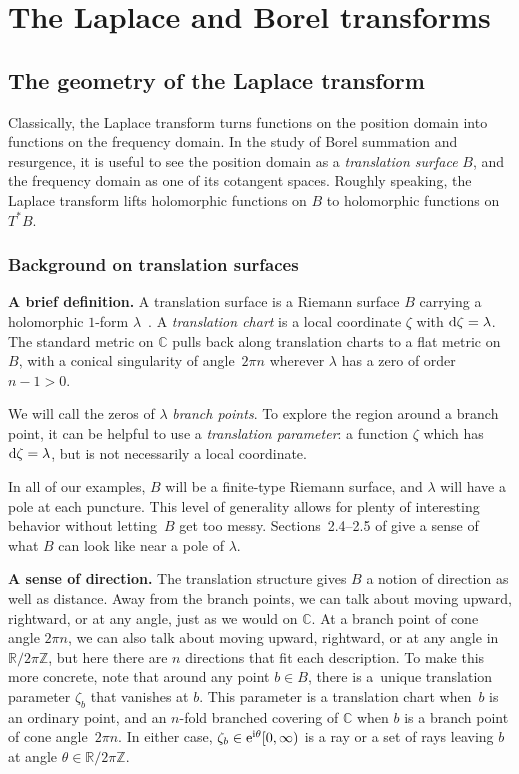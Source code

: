 \documentclass[10pt,a4paper]{amsart}
\newcommand{\Z}{\mathbb{Z}}
\newcommand{\R}{\mathbb{R}}
\newcommand{\C}{\mathbb{C}}
\numberwithin{equation}{section}
\begin{document}
\section{The Laplace and Borel transforms}\label{sec:Laplace-Borel-general}
\subsection{The geometry of the Laplace transform}\label{sec:geometry_laplace}
Classically, the Laplace transform turns functions on the position domain into functions on the frequency domain. In the study of Borel summation and resurgence, it is useful to see the position domain as a {\em translation surface} $B$, and the frequency domain as one of its cotangent spaces. Roughly speaking, the Laplace transform lifts holomorphic functions on $B$ to holomorphic functions on $T^*B$.
%
\subsubsection{Background on translation surfaces}\label{sec:transl}

{\bf A brief definition.}
%
A translation surface is a Riemann surface $B$ carrying a holomorphic $1$-form $\lambda$~\cite{zorich2006flat}. A {\em translation chart} is a local coordinate $\zeta$ with ${\rm d}\zeta = \lambda$. The standard metric on $\C$ pulls back along translation charts to a flat metric on $B$, with a conical singularity of angle~$2\pi n$ wherever $\lambda$ has a zero of order $n-1 > 0$.

We will call the zeros of $\lambda$ {\em branch points}. To explore the region around a branch point, it can be helpful to use a {\em translation parameter}: a function $\zeta$ which has ${\rm d}\zeta = \lambda$, but is not necessarily a local coordinate.

In all of our examples, $B$ will be a finite-type Riemann surface, and $\lambda$ will have a pole at each puncture. This level of generality allows for plenty of interesting behavior without letting~$B$ get too messy. Sections~2.4--2.5 of \cite{gupta2013meromorphic} give a sense of what $B$ can look like near a pole of $\lambda$.

{\bf A sense of direction.}
The translation structure gives $B$ a notion of direction as well as distance. Away from the branch points, we can talk about moving upward, rightward, or at any angle, just as we would on $\C$. At a branch point of cone angle $2\pi n$, we can also talk about moving upward, rightward, or at any angle in $\R/2\pi\Z$, but here there are $n$ directions that fit each description. To make this more concrete, note that around any point $b \in B$, there is a~unique translation parameter $\zeta_b$ that vanishes at $b$. This parameter is a translation chart when~$b$ is an ordinary point, and an $n$-fold branched covering of $\C$ when $b$ is a branch point of cone angle~$2\pi n$. In either case, $\zeta_b \in {\rm e}^{{\rm i}\theta} [0, \infty)$ is a ray or a set of rays leaving $b$ at angle $\theta \in \R/2\pi\Z$.
\end{document}
